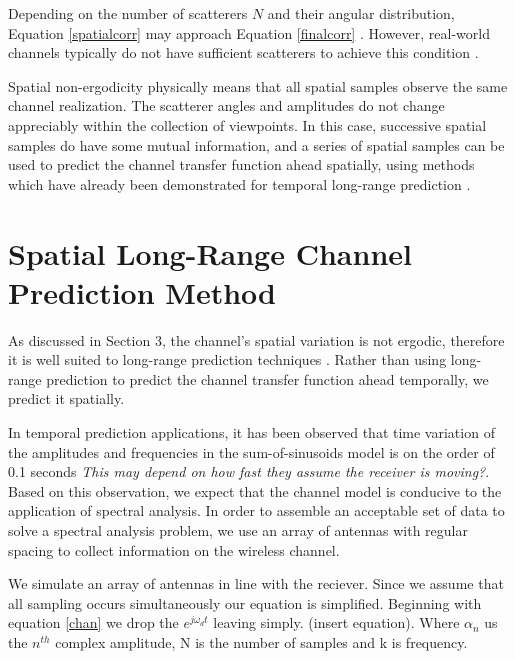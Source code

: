 \documentclass[11pt]{article} %
\begin{document}
Depending on the number of scatterers $N$ and their angular distribution, Equation \ref{spatialcorr} may approach Equation \ref{finalcorr} \cite{isukapalli2006}.  However, real-world channels typically do not have sufficient scatterers to achieve this condition \cite{duel-hallen2000}.  

Spatial non-ergodicity physically means that all spatial samples observe the same channel realization.  The scatterer angles and amplitudes do not change appreciably within the collection of viewpoints.  In this case, successive spatial samples do have some mutual information, and a series of spatial samples can be used to predict the channel transfer function ahead spatially, using methods which have already been demonstrated for temporal long-range prediction \cite{duel-hallen2000}.

\section{Spatial Long-Range Channel Prediction Method}\label{prediction}
As discussed in Section 3, the channel's spatial variation is not ergodic, therefore it is well suited to long-range prediction techniques \cite{(someone, perhaps a duel-hallen paper, said this)}. Rather than using long-range prediction to predict the channel transfer function ahead temporally, we predict it spatially. 

 In temporal prediction applications, it has been observed that time variation of the amplitudes and frequencies in the sum-of-sinusoids model is on the order of 0.1 seconds \cite{duel-hallen2007} \emph{This may depend on how fast they assume the receiver is moving?}.  Based on this observation, we expect that the channel model is conducive to the application of spectral analysis. In order to assemble an acceptable set of data to solve a spectral analysis problem, we use an array of antennas with regular spacing to collect information on the wireless channel.

We simulate an array of antennas in line with the reciever. Since we assume that all sampling occurs simultaneously our equation is simplified. Beginning with equation \ref{chan} we drop the $e^{j\omega_d t}$ leaving simply. (insert equation). Where $\alpha_n$ us the $n^{th}$ complex amplitude, N is the number of samples and k is frequency.
\end{document}
